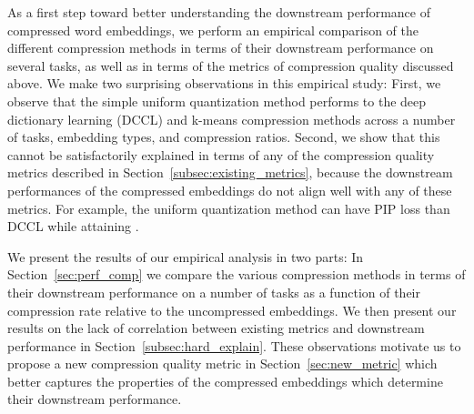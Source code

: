 As a first step toward better understanding the downstream performance of compressed word embeddings, we perform an empirical comparison of the different compression methods in terms of their downstream performance on several tasks, as well as in terms of the metrics of compression quality discussed above.
We make two surprising observations in this empirical study:
First, we observe that the simple uniform quantization method performs  to the deep dictionary learning (DCCL) and k-means compression methods across a number of tasks, embedding types, and compression ratios.
Second, we show that this cannot be satisfactorily explained in terms of any of the compression quality metrics described in Section~\ref{subsec:existing_metrics}, because the downstream performances of the compressed embeddings do not align well with any of these metrics.
For example, the uniform quantization method can have  PIP loss than DCCL while attaining .

We present the results of our empirical analysis in two parts:
In Section~\ref{sec:perf_comp} we compare the various compression methods in terms of their downstream performance on a number of tasks as a function of their compression rate relative to the uncompressed embeddings.
We then present our results on the lack of correlation between existing metrics and downstream performance in Section~\ref{subsec:hard_explain}.
These observations motivate us to propose a new compression quality metric in Section~\ref{sec:new_metric} which better captures the properties of the compressed embeddings which determine their downstream performance.

